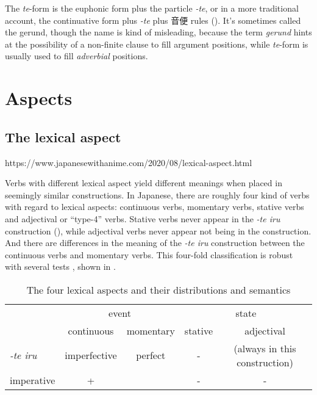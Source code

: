 \documentclass[UTF8, a4paper, oneside, scheme=plain]{ctexrep}
\newcommand*{\citesec}[1]{\S~{#1}}
\newcommand*{\term}[1]{\emph{#1}}
\newcommand{\corpus}[1]{\emph{#1}}
\begin{document}
The \corpus{te}-form is the euphonic form plus the particle \corpus{-te},
or in a more traditional account,
the continuative form plus \corpus{-te} plus 音便 rules ().
It's sometimes called the gerund,
though the name is kind of misleading,
because the term \term{gerund} hints at the possibility of a non-finite clause to fill argument positions,
while \corpus{te}-form is usually used to fill \emph{adverbial} positions.

\section{Aspects}\label{sec:aspect}

\subsection{The lexical aspect}\label{sec:lexical-aspect}

https://www.japanesewithanime.com/2020/08/lexical-aspect.html

Verbs with different lexical aspect yield different meanings 
when placed in seemingly similar constructions.
In Japanese, there are roughly four kind of verbs with regard to lexical aspects:
continuous verbs, momentary verbs, stative verbs and adjectival or ``type-4'' verbs.
Stative verbs never appear in the \corpus{-te iru} construction (),
while adjectival verbs never appear not being in the construction.
And there are differences in the meaning of the \corpus{-te iru} construction 
between the continuous verbs and momentary verbs.
This four-fold classification is robust with several tests \citep[\citesec{3.1}]{gu2004},
shown in .

\begin{table}[H]
    \centering
    \caption{The four lexical aspects and their distributions and semantics}
    \label{tbl:lexical-aspect}
    \begin{tabular}{lcccc}
        \toprule
                     & \multicolumn{2}{c}{event} & \multicolumn{2}{c}{state} \\
                     & continuous    & momentary & stative    & adjectival   \\ \midrule
    \corpus{-te iru} & imperfective  & perfect   & -          & (always in this construction)       \\ 
    imperative       & +             &           & -          & -             \\  \bottomrule
    \end{tabular}
\end{table}
\end{document}
